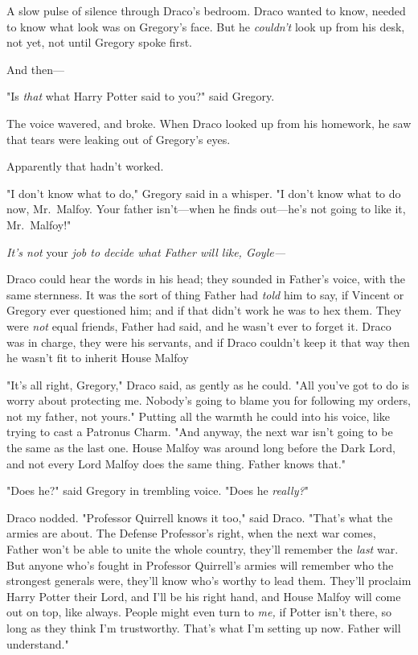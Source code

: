 A slow pulse of silence through Draco's bedroom. Draco wanted to know, needed
to know what look was on Gregory's face. But he \emph{couldn't} look up from
his desk, not yet, not until Gregory spoke first.

And then—

"Is \emph{that} what Harry Potter said to you?" said Gregory.

The voice wavered, and broke. When Draco looked up from his homework, he saw
that tears were leaking out of Gregory's eyes.

Apparently that hadn't worked.

"I don't know what to do," Gregory said in a whisper. "I don't know what to do
now, Mr.~Malfoy. Your father isn't—when he finds out—he's not going to like
it, Mr.~Malfoy!"

\emph{It's not} your \emph{job to decide what Father will like, Goyle—}

Draco could hear the words in his head; they sounded in Father's voice, with
the same sternness. It was the sort of thing Father had \emph{told} him to say,
if Vincent or Gregory ever questioned him; and if that didn't work he was to
hex them. They were \emph{not} equal friends, Father had said, and he wasn't
ever to forget it. Draco was in charge, they were his servants, and if Draco
couldn't keep it that way then he wasn't fit to inherit House Malfoy{\el}

"It's all right, Gregory," Draco said, as gently as he could. "All you've got
to do is worry about protecting me. Nobody's going to blame you for following
my orders, not my father, not yours." Putting all the warmth he could into his
voice, like trying to cast a Patronus Charm. "And anyway, the next war isn't
going to be the same as the last one. House Malfoy was around long before the
Dark Lord, and not every Lord Malfoy does the same thing. Father knows that."

"Does he?" said Gregory in trembling voice. "Does he \emph{really?}"

Draco nodded. "Professor Quirrell knows it too," said Draco. "That's what the
armies are about. The Defense Professor's right, when the next war comes,
Father won't be able to unite the whole country, they'll remember the
\emph{last} war. But anyone who's fought in Professor Quirrell's armies will
remember who the strongest generals were, they'll know who's worthy to lead
them. They'll proclaim Harry Potter their Lord, and I'll be his right hand, and
House Malfoy will come out on top, like always. People might even turn to
\emph{me,} if Potter isn't there, so long as they think I'm trustworthy. That's
what I'm setting up now. Father will understand."


